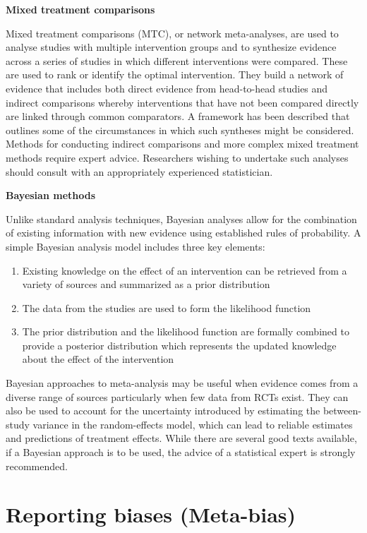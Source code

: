 \documentclass[
  11pt,
  a4paper,
  DIV=11,
  numbers=noendperiod]{scrreprt}
\begin{document}
\textbf{Mixed treatment comparisons}

Mixed treatment comparisons (MTC), or network meta-analyses, are used to
analyse studies with multiple intervention groups and to synthesize
evidence across a series of studies in which different interventions
were compared. These are used to rank or identify the optimal
intervention. They build a network of evidence that includes both direct
evidence from head-to-head studies and indirect comparisons whereby
interventions that have not been compared directly are linked through
common comparators. A framework has been described that outlines some of
the circumstances in which such syntheses might be considered. Methods
for conducting indirect comparisons and more complex mixed treatment
methods require expert advice. Researchers wishing to undertake such
analyses should consult with an appropriately experienced statistician.

\textbf{Bayesian methods}

Unlike standard analysis techniques, Bayesian analyses allow for the
combination of existing information with new evidence using established
rules of probability. A simple Bayesian analysis model includes three
key elements:

\begin{enumerate}
\def\labelenumi{\arabic{enumi}.}
\item
  Existing knowledge on the effect of an intervention can be retrieved
  from a variety of sources and summarized as a prior distribution
\item
  The data from the studies are used to form the likelihood function
\item
  The prior distribution and the likelihood function are formally
  combined to provide a posterior distribution which represents the
  updated knowledge about the effect of the intervention
\end{enumerate}

Bayesian approaches to meta-analysis may be useful when evidence comes
from a diverse range of sources particularly when few data from RCTs
exist. They can also be used to account for the uncertainty introduced
by estimating the between-study variance in the random-effects model,
which can lead to reliable estimates and predictions of treatment
effects. While there are several good texts available, if a Bayesian
approach is to be used, the advice of a statistical expert is strongly
recommended.

\section{Reporting biases
(Meta-bias)}\label{reporting-biases-meta-bias-1}
\end{document}
